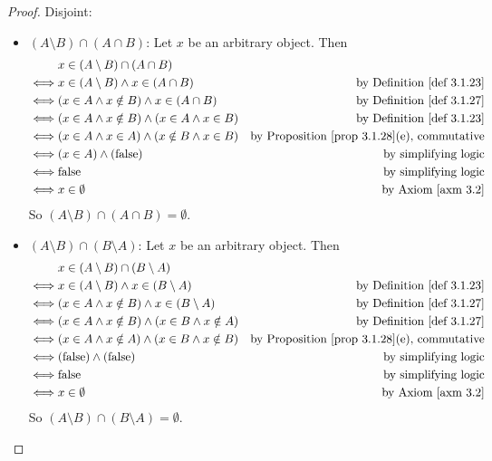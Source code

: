 \begin{proof}
Disjoint:
\begin{itemize}
    \item \((A \setminus B) \cap (A \cap B)\): Let \(x\) be an arbitrary object. Then
        \begin{align*}
             & x \in (A \setminus B) \cap (A \cap B) \\
        \iff & x \in (A \setminus B) \land x \in (A \cap B) & \text{by \DEF{3.1.23}} \\
        \iff & (x \in A \land x \notin B) \land x \in (A \cap B) & \text{by \DEF{3.1.27}} \\
        \iff & (x \in A \land x \notin B) \land (x \in A \land x \in B) & \text{by \DEF{3.1.23}} \\
        \iff & (x \in A \land x \in A) \land (x \notin B \land x \in B) & \text{by \PROP{3.1.28}(e), commutative} \\
        \iff & (x \in A) \land (\text{false}) & \text{by simplifying logic} \\
        \iff & \text{false} & \text{by simplifying logic} \\
        \iff & x \in \emptyset & \text{by \AXM{3.2}}
        \end{align*}
        So \((A \setminus B) \cap (A \cap B) = \emptyset\).
    \item \((A \setminus B) \cap (B \setminus A)\): Let \(x\) be an arbitrary object. Then
        \begin{align*}
             & x \in (A \setminus B) \cap (B \setminus A) \\
        \iff & x \in (A \setminus B) \land x \in (B \setminus A) & \text{by \DEF{3.1.23}} \\
        \iff & (x \in A \land x \notin B) \land x \in (B \setminus A) & \text{by \DEF{3.1.27}} \\
        \iff & (x \in A \land x \notin B) \land (x \in B \land x \notin A) & \text{by \DEF{3.1.27}} \\
        \iff & (x \in A \land x \notin A) \land (x \in B \land x \notin B) & \text{by \PROP{3.1.28}(e), commutative} \\
        \iff & (\text{false}) \land (\text{false}) & \text{by simplifying logic} \\
        \iff & \text{false} & \text{by simplifying logic} \\
        \iff & x \in \emptyset & \text{by \AXM{3.2}}
        \end{align*}
        So \((A \setminus B) \cap (B \setminus A) = \emptyset\).

\end{itemize}
\end{proof}
